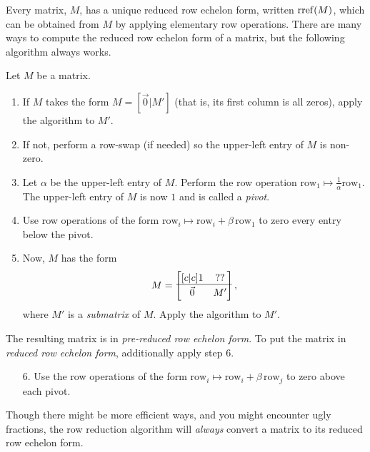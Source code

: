 	\medskip
	Every matrix, $M$, has a unique reduced row echelon form, written $\operatorname{rref}(M)$, which can be obtained from
	$M$ by applying elementary row operations. There are many ways to compute the reduced row echelon form
	of a matrix, but the following algorithm always works.

	\begin{definition}
		Let $M$ be a matrix.
		\begin{enumerate}
			\item If $M$ takes the form $M=[\vec 0|M']$ (that is, its first column
			is all zeros), apply the algorithm to $M'$.
		\item If not, perform a row-swap (if needed) so the upper-left entry of $M$ is
				non-zero.
			\item Let $\alpha$ be the upper-left entry of $M$. 
				Perform the row operation $\text{row}_1\mapsto \tfrac{1}{\alpha}\text{row}_1$.
				The upper-left entry of $M$ is now $1$ and is called a 
				\emph{pivot}.
			\item Use row operations of the form $\text{row}_i\mapsto \text{row}_i+\beta\,\text{row}_1$
			to zero every entry below the pivot.
			\item Now, $M$ has the form
			\[
				M=\begin{bmatrix}[c|c]
					1 & ??\\
					\hline\\[\dimexpr-\normalbaselineskip+2pt]
					\vec 0 & M'
				\end{bmatrix},
			\]
			where $M'$ is a {\it submatrix} of $M$.
			Apply the algorithm to $M'$.

		\end{enumerate}

		The resulting matrix is in \emph{pre-reduced row echelon form}. To put the matrix in 
		\emph{reduced row echelon form}, additionally apply step 6.
		\begin{enumerate}
			\item[6.] Use the row operations of the form $\text{row}_i\mapsto \text{row}_i+\beta\,\text{row}_j$
			to zero above each pivot.
		\end{enumerate}
	\end{definition}

	Though there might be more efficient ways, and you might encounter ugly fractions, the row reduction algorithm will
	\emph{always} convert a matrix to its reduced row echelon form.

